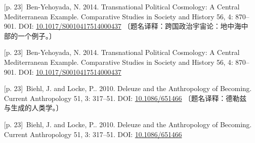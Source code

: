 \documentclass[10pt,a4paper]{article}
\begin{document}
\noindent\begin{minipage}{\textwidth}\begin{minipage}[t]{\dimexpr.5\textwidth-4mm\relax}\noindent\begin{minipage}[t]{\linewidth}{\scriptsize\color{gray} [p. 23]}\ Ben-Yehoyada, N. 2014. Transnational Political Cosmology: A Central Mediterranean Example. Comparative Studies in Society and History 56, 4: 870–901. DOI: \url{10.1017/S0010417514000437} 〔题名译释：跨国政治宇宙论：地中海中部的一个例子。〕\par\end{minipage}\par\end{minipage}\hfill\begin{minipage}[t]{\dimexpr.5\textwidth-4mm\relax}\noindent\begin{minipage}[t]{\linewidth}{\scriptsize\color{gray} [p. 23]}\ Ben-Yehoyada, N. 2014. Transnational Political Cosmology: A Central Mediterranean Example. Comparative Studies in Society and History 56, 4: 870–901. DOI: \url{10.1017/S0010417514000437}\par\end{minipage}\par\end{minipage}\end{minipage}\par
\noindent\begin{minipage}{\textwidth}\begin{minipage}[t]{\dimexpr.5\textwidth-4mm\relax}\noindent\begin{minipage}[t]{\linewidth}{\scriptsize\color{gray} [p. 23]}\ Biehl, J. and Locke, P.. 2010. Deleuze and the Anthropology of Becoming. Current Anthropology 51, 3: 317–51. DOI: \url{10.1086/651466} 〔题名译释：德勒兹与生成的人类学。〕\par\end{minipage}\par\end{minipage}\hfill\begin{minipage}[t]{\dimexpr.5\textwidth-4mm\relax}\noindent\begin{minipage}[t]{\linewidth}{\scriptsize\color{gray} [p. 23]}\ Biehl, J. and Locke, P.. 2010. Deleuze and the Anthropology of Becoming. Current Anthropology 51, 3: 317–51. DOI: \url{10.1086/651466}\par\end{minipage}\par\end{minipage}\end{minipage}\par
\end{document}
